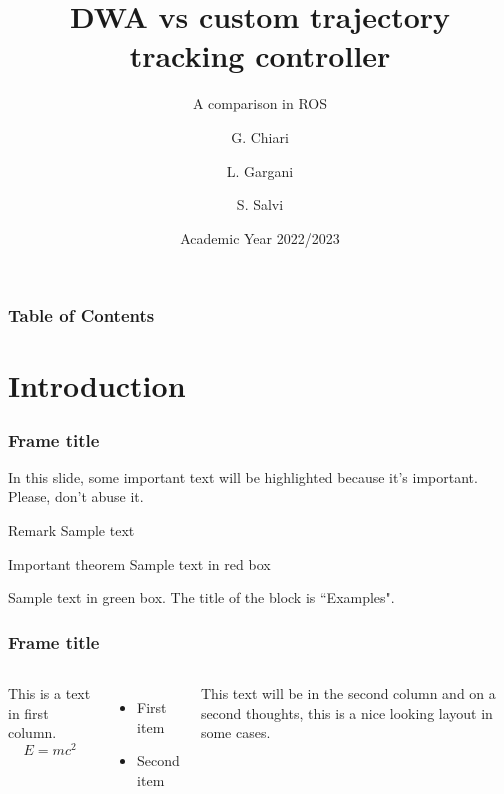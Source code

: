 \documentclass{beamer}
\title{DWA vs custom trajectory tracking controller}
\subtitle{A comparison in ROS}
\author[Chiari, Gargani, Salvi] {G. Chiari \and L. Gargani \and S. Salvi}
\institute {Politecnico di Milano}
\date {Academic Year 2022/2023}
\begin{document}
\begin{frame}
\titlepage
\end{frame}

\begin{frame}
\frametitle{Table of Contents}
\tableofcontents
\end{frame}





\section{Introduction}


\begin{frame}
\frametitle{Frame title}

In this slide, some important text will be \alert{highlighted} because it's important.
Please, don't abuse it.

\begin{block}{Remark}
Sample text
\end{block}

\begin{alertblock}{Important theorem}
Sample text in red box
\end{alertblock}

\begin{examples}
Sample text in green box. The title of the block is ``Examples".
\end{examples}

\end{frame}


\begin{frame}
\frametitle{Frame title}

\begin{columns}

This is a text in first column.
$$E=mc^2$$
\begin{itemize}
	\item First item
	\item Second item
\end{itemize}

This text will be in the second column and on a second thoughts, this is a nice looking layout in some cases.

\end{columns}

\end{frame}
\end{document}
